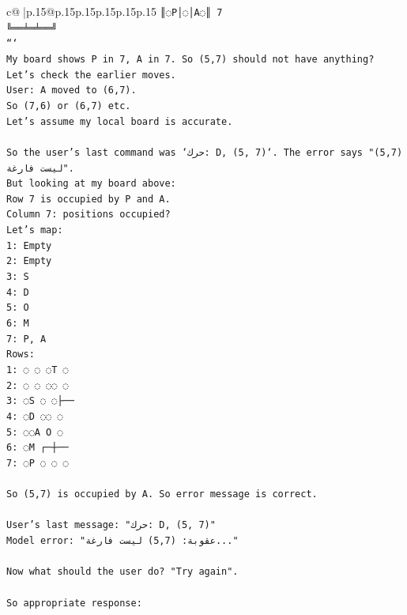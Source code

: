 \documentclass{article}
\begin{document}
{\begin{supertabular}{c@{$\;$}|p{.15\linewidth}@{}p{.15\linewidth}p{.15\linewidth}p{.15\linewidth}p{.15\linewidth}p{.15\linewidth}}
{{{\texttt{║◌P│◌│A◌║ 7} \\
\texttt{╚══╧═╧══╝} \\
\texttt{```} \\
\texttt{My board shows P in 7, A in 7. So (5,7) should not have anything? Let's check the earlier moves.} \\
\texttt{User: A moved to (6,7).} \\
\texttt{So (7,6) or (6,7) etc.} \\
\texttt{Let's assume my local board is accurate.} \\
\\ 
\texttt{So the user's last command was `حرك: D, (5, 7)`. The error says "(5,7) ليست فارغة".} \\
\texttt{But looking at my board above:} \\
\texttt{Row 7 is occupied by P and A.} \\
\texttt{Column 7: positions occupied?} \\
\texttt{Let's map:} \\
\texttt{1: Empty} \\
\texttt{2: Empty} \\
\texttt{3: S} \\
\texttt{4: D} \\
\texttt{5: O} \\
\texttt{6: M} \\
\texttt{7: P, A} \\
\texttt{Rows:} \\
\texttt{1: ◌ ◌ ◌T ◌} \\
\texttt{2: ◌ ◌ ◌◌ ◌} \\
\texttt{3: ◌S ◌ ◌├──} \\
\texttt{4: ◌D ◌◌ ◌} \\
\texttt{5: ◌◌A O ◌} \\
\texttt{6: ◌M ┌─┼──} \\
\texttt{7: ◌P ◌ ◌ ◌} \\
\\ 
\texttt{So (5,7) is occupied by A. So error message is correct.} \\
\\ 
\texttt{User's last message: "حرك: D, (5, 7)"} \\
\texttt{Model error: "عقوبة: (5,7) ليست فارغة..."} \\
\\ 
\texttt{Now what should the user do? "Try again".} \\
\\ 
\texttt{So appropriate response:} \\
}}}
\end{supertabular}}
\end{document}
